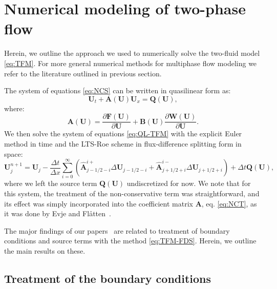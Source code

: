 {\section{Numerical modeling of two-phase flow}
\label{sec:MFM-numerics}

Herein, we outline the approach we used to numerically solve the two-fluid model \eqref{eq:TFM}. For more general numerical methods for multiphase flow modeling we refer to the literature outlined in previous section.

The system of equations \eqref{eq:NCS} can be written in quasilinear form as:
\begin{equation} \label{eq:QL-TFM}
\mathbf{U}_t + \mathbf{A(U)} \mathbf{U}_x = \mathbf{Q(U)},
\end{equation}
where:
\begin{equation} \label{eq:NCT}
\mathbf{A(U)} = \frac{\partial \mathbf{F(U)}}{\partial \mathbf{U}} + \mathbf{B(U)} \frac{\partial \mathbf{W(U)}}{\partial \mathbf{U}}.
\end{equation}
We then solve the system of equations \eqref{eq:QL-TFM} with the explicit Euler method in time and the LTS-Roe scheme in flux-difference splitting form in space:
\begin{equation} \label{eq:TFM-FDS}
\mathbf{U}_j^{n+1} = \mathbf{U}_j - \frac{\Delta t}{\Delta x} \sum\limits_{i=0}^{\infty} \left( \hat{\mathbf{A}}_{j-1/2-i}^{i+} \Delta \mathbf{U}_{j-1/2-i} + \hat{\mathbf{A}}_{j+1/2+i}^{i-} \Delta \mathbf{U}_{j+1/2+i} \right) + \Delta t \mathbf{Q(U)},
\end{equation}
where we left the source term $ \mathbf{Q(U)} $ undiscretized for now. We note that for this system, the treatment of the non-conservative term was straightforward, and its effect was simply incorporated into the coefficient matrix $ \mathbf{A} $, eq. \eqref{eq:NCT}, as it was done by Evje and Fl\aa{}tten~\cite{evj03}.

The major findings of our papers~\cite{jp1,cp1} are related to treatment of boundary conditions and source terms with the method \eqref{eq:TFM-FDS}. Herein, we outline the main results on these.

\subsection{Treatment of the boundary conditions}

}
